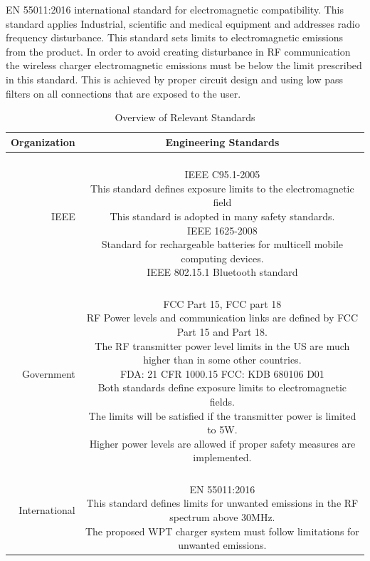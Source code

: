 \documentclass[12pt]{article}
\begin{document}
\indent
EN 55011:2016 international standard for electromagnetic compatibility. This standard applies Industrial, scientific and medical equipment and  addresses  radio frequency disturbance. This standard sets limits to electromagnetic emissions from the product. In order to avoid creating disturbance in RF communication the wireless charger electromagnetic emissions must be below the limit prescribed in this standard. This is achieved by proper circuit design and using  low pass filters on all connections that are exposed to the user.
\hfill 
\begin{table}[h!]
\centering
\caption{Overview of Relevant Standards}
\begin{tabular} {| r | c | }
\hline
\parbox{0.17\linewidth}{\centering Organization} &   \parbox{0.772\linewidth}{\centering Engineering Standards}\\
\hline
\parbox{0.17\linewidth}{\raggedleft IEEE} &   \parbox{0.772\linewidth}{\hfill \\
IEEE C95.1-2005\\
This standard defines exposure limits to the electromagnetic field \\
This standard is adopted in many safety standards. \\
IEEE 1625-2008 \\
Standard for rechargeable batteries for multicell mobile computing devices.\\
IEEE 802.15.1 Bluetooth standard \\
}\\
\hline
\parbox{0.17\linewidth}{\raggedleft Government} &   \parbox{0.772\linewidth}{\hfill \\
FCC Part 15, FCC part 18\\
RF Power levels and communication links are defined by FCC Part 15 and Part 18.\\
The RF transmitter power level limits in the US are much higher than in some other countries.\\
FDA: 21 CFR 1000.15 FCC: KDB 680106 D01   \\
Both standards define exposure limits to electromagnetic fields.\\
The limits will be satisfied if the transmitter power is limited to 5W.\\
Higher power levels are allowed if proper safety measures are implemented.\\
}\\
\hline
\parbox{0.17\linewidth}{\raggedleft International} &   \parbox{0.772\linewidth}{\hfill \\
EN 55011:2016\\
This standard defines limits for unwanted emissions in the RF spectrum above 30MHz. \\
The proposed WPT charger system must follow limitations for unwanted emissions.\\
}\\
\hline
\end{tabular}
\end{table}
\end{document}
